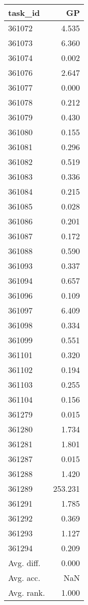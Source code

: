 \begin{tabular}{lr}
\toprule
task\_id & GP \\
\midrule
361072 & 4.535 \\
361073 & 6.360 \\
361074 & 0.002 \\
361076 & 2.647 \\
361077 & 0.000 \\
361078 & 0.212 \\
361079 & 0.430 \\
361080 & 0.155 \\
361081 & 0.296 \\
361082 & 0.519 \\
361083 & 0.336 \\
361084 & 0.215 \\
361085 & 0.028 \\
361086 & 0.201 \\
361087 & 0.172 \\
361088 & 0.590 \\
361093 & 0.337 \\
361094 & 0.657 \\
361096 & 0.109 \\
361097 & 6.409 \\
361098 & 0.334 \\
361099 & 0.551 \\
361101 & 0.320 \\
361102 & 0.194 \\
361103 & 0.255 \\
361104 & 0.156 \\
361279 & 0.015 \\
361280 & 1.734 \\
361281 & 1.801 \\
361287 & 0.015 \\
361288 & 1.420 \\
361289 & 253.231 \\
361291 & 1.785 \\
361292 & 0.369 \\
361293 & 1.127 \\
361294 & 0.209 \\
Avg. diff. & 0.000 \\
Avg. acc. & NaN \\
Avg. rank. & 1.000 \\
\bottomrule
\end{tabular}
